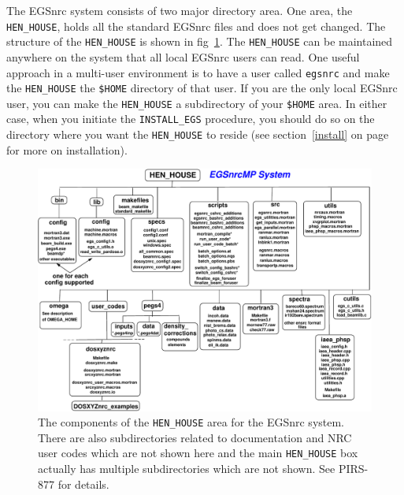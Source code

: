 The EGSnrc system consists of two major directory area. 
One area, the \verb+HEN_HOUSE+, holds all the standard EGSnrc files
and does not get changed. The structure of the \verb+HEN_HOUSE+ is
shown in fig~\ref{fig_hen_house_2}.  The \verb+HEN_HOUSE+ can be maintained
anywhere on the system that all local EGSnrc users can read. One useful
approach in a multi-user environment is to have a user called {\tt egsnrc} and
make the \verb+HEN_HOUSE+ the {\tt \$HOME}  directory of that user. If you
are the only local EGSnrc user, you can make the \verb+HEN_HOUSE+ a
subdirectory of your {\tt \$HOME} area.  In either case, when you initiate
the {\tt INSTALL\_EGS} procedure, you should do so on the directory
where you want the \verb+HEN_HOUSE+ to reside (see section~\ref{install} on
page ~\pageref{install} for more on installation).
\vspace*{-0.4cm}
\begin{figure}[h]
\begin{center}
\leavevmode
\mbox{}\hspace{-1cm}
\includegraphics[width=15cm]{figures/egsnrc_system}
    \caption[Components of the {\tt HEN\_HOUSE} area for the EGSnrc 
system.]
{The components of the {\tt HEN\_HOUSE} area for the EGSnrc
system. There are also subdirectories related to documentation and 
NRC user codes which are not shown here and the main {\tt HEN\_HOUSE} box
actually has multiple subdirectories which are not shown. See PIRS-877 for
details\cite{Ka03}.}
\label{fig_hen_house_2}
\end{center}
\end{figure}

